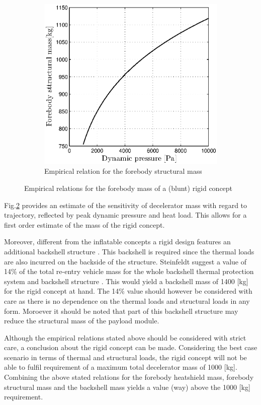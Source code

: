 \begin{figure}[h]
\begin{subfigure}[b]{0.49\textwidth}
	\includegraphics[width=1.0\textwidth]{Figure/rigidstruct.eps}
	\caption{Empirical relation for the forebody structural mass} 
	\label{fig:rigidstruct}
	\end{subfigure}
	\caption{Empirical relations for the forebody mass of a (blunt) rigid concept}
	\label{fig:rigid}
\end{figure}

Fig.\ref{fig:rigid} provides an estimate of the sensitivity of decelerator mass with regard to trajectory, reflected by peak dynamic pressure and heat load. This allows for a first order estimate of the mass of the rigid concept.

Moreover, different from the inflatable concepts a rigid design features an additional backshell structure \cite{Hughes2005}. This backshell is required since the thermal loads are also incurred on the backside of the structure. Steinfeldt suggest a value of 14\% of the total re-entry vehicle mass for the whole backshell thermal protection system and backshell structure \cite{Steindelft2009}. This would yield a backshell mass of 1400 [kg] for the rigid concept at hand. The 14\% value should however be considered with care as there is no dependence on the thermal loads and structural loads in any form. Moroever it should be noted that part of this backshell structure may reduce the structural mass of the payload module.

Although the empirical relations stated above should be considered with strict care, a conclusion about the rigid concept can be made. Considering the best case scenario in terms of thermal and structural loads, the rigid concept will not be able to fulfil requirement of a maximum total decelerator mass of 1000 [kg]. Combining the above stated relations for the forebody heatshield mass, forebody structural mass and the backshell mass yields a value (way) above the 1000 [kg] requirement.

